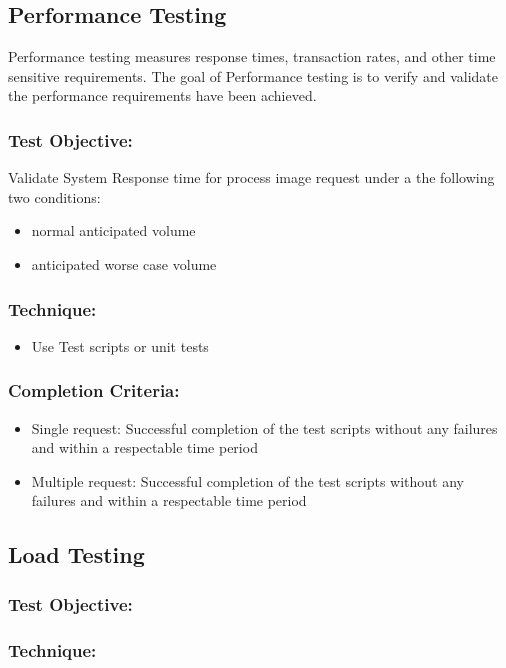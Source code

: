 \documentclass[a4paper,12pt]{report}
\begin{document}
		\subsection {Performance Testing}
			Performance testing measures response times, transaction rates, and other time sensitive requirements. 
			The goal of Performance testing is to verify and validate the performance requirements have been achieved. 
			\subsubsection {Test Objective:}
					Validate System Response time for process image request under a the following two conditions:
					\begin {itemize}
						\item normal anticipated volume
						\item anticipated worse case volume
					\end {itemize}
			\subsubsection {Technique:}
				\begin {itemize}
					\item Use Test scripts or unit tests 
				\end {itemize}
			\subsubsection {Completion Criteria:}
				\begin {itemize}
					\item Single request: Successful completion of the test scripts without any failures and within a respectable time period
					\item Multiple request: Successful completion of the test scripts without any failures and within a respectable time period
				\end {itemize}
				
		\subsection {Load Testing}
			\subsubsection {Test Objective:}
			\subsubsection {Technique:}
\end{document}
